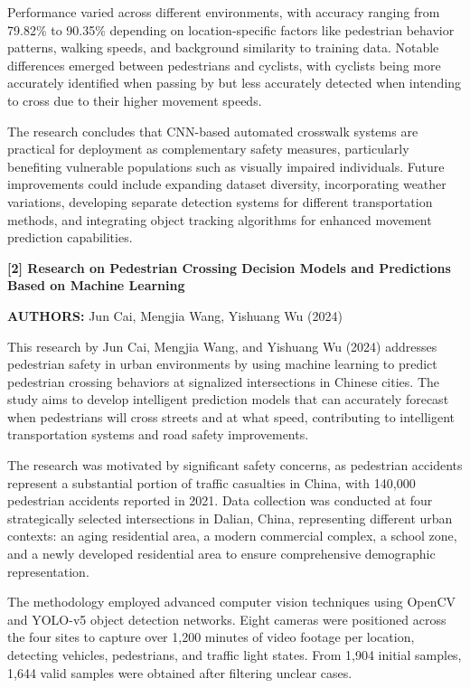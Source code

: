 \documentclass[a4paper, 12pt]{report}
\begin{document}
Performance varied across different environments, with accuracy ranging from 79.82\% to 90.35\% depending on location-specific factors like pedestrian behavior patterns, walking speeds, and background similarity to training data. Notable differences emerged between pedestrians and cyclists, with cyclists being more accurately identified when passing by but less accurately detected when intending to cross due to their higher movement speeds.

The research concludes that CNN-based automated crosswalk systems are practical for deployment as complementary safety measures, particularly benefiting vulnerable populations such as visually impaired individuals. Future improvements could include expanding dataset diversity, incorporating weather variations, developing separate detection systems for different transportation methods, and integrating object tracking algorithms for enhanced movement prediction capabilities.

\noindent \textbf{[2] Research on Pedestrian Crossing Decision Models and Predictions Based on Machine Learning}

\textbf{AUTHORS:} Jun Cai, Mengjia Wang, Yishuang Wu (2024)

This research by Jun Cai, Mengjia Wang, and Yishuang Wu (2024) addresses pedestrian safety in urban environments by using machine learning to predict pedestrian crossing behaviors at signalized intersections in Chinese cities. The study aims to develop intelligent prediction models that can accurately forecast when pedestrians will cross streets and at what speed, contributing to intelligent transportation systems and road safety improvements.

The research was motivated by significant safety concerns, as pedestrian accidents represent a substantial portion of traffic casualties in China, with 140,000 pedestrian accidents reported in 2021. Data collection was conducted at four strategically selected intersections in Dalian, China, representing different urban contexts: an aging residential area, a modern commercial complex, a school zone, and a newly developed residential area to ensure comprehensive demographic representation.

The methodology employed advanced computer vision techniques using OpenCV and YOLO-v5 object detection networks. Eight cameras were positioned across the four sites to capture over 1,200 minutes of video footage per location, detecting vehicles, pedestrians, and traffic light states. From 1,904 initial samples, 1,644 valid samples were obtained after filtering unclear cases.
\end{document}
